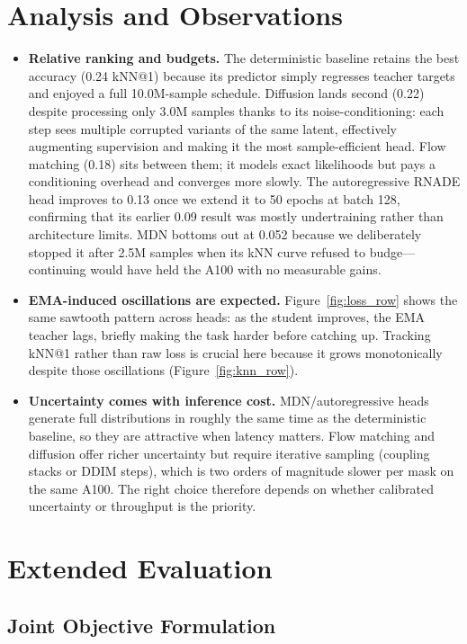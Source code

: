 \documentclass[conference]{IEEEtran}
\begin{document}
\section{Analysis and Observations}
\begin{itemize}
    \item \textbf{Relative ranking and budgets.} The deterministic baseline retains the best accuracy (0.24 kNN@1) because its predictor simply regresses teacher targets and enjoyed a full 10.0M-sample schedule. Diffusion lands second (0.22) despite processing only 3.0M samples thanks to its noise-conditioning: each step sees multiple corrupted variants of the same latent, effectively augmenting supervision and making it the most sample-efficient head. Flow matching (0.18) sits between them; it models exact likelihoods but pays a conditioning overhead and converges more slowly. The autoregressive RNADE head improves to 0.13 once we extend it to 50 epochs at batch 128, confirming that its earlier 0.09 result was mostly undertraining rather than architecture limits. MDN bottoms out at 0.052 because we deliberately stopped it after 2.5M samples when its kNN curve refused to budge—continuing would have held the A100 with no measurable gains.
    \item \textbf{EMA-induced oscillations are expected.} Figure~\ref{fig:loss_row} shows the same sawtooth pattern across heads: as the student improves, the EMA teacher lags, briefly making the task harder before catching up. Tracking kNN@1 rather than raw loss is crucial here because it grows monotonically despite those oscillations (Figure~\ref{fig:knn_row}).
    \item \textbf{Uncertainty comes with inference cost.} MDN/autoregressive heads generate full distributions in roughly the same time as the deterministic baseline, so they are attractive when latency matters. Flow matching and diffusion offer richer uncertainty but require iterative sampling (coupling stacks or DDIM steps), which is two orders of magnitude slower per mask on the same A100. The right choice therefore depends on whether calibrated uncertainty or throughput is the priority.
\end{itemize}

\section{Extended Evaluation}
\subsection{Joint Objective Formulation}
\vspace{2mm}
\end{document}
